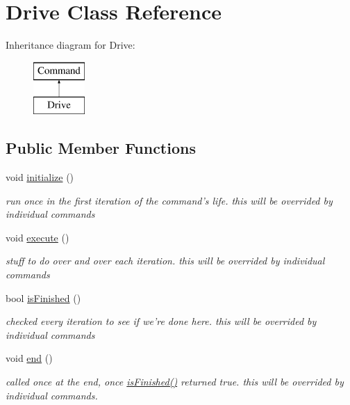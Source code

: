 \hypertarget{classDrive}{\section{Drive Class Reference}
\label{classDrive}
}
Inheritance diagram for Drive\-:\begin{figure}[H]
\begin{center}
\leavevmode
\includegraphics[height=2.000000cm]{classDrive}
\end{center}
\end{figure}
\subsection*{Public Member Functions}
\begin{DoxyCompactItemize}
\item 
\hypertarget{classDrive_af986858a5eebcca5a80569d7d4174c7f}{void \hyperlink{classDrive_af986858a5eebcca5a80569d7d4174c7f}{initialize} ()}\label{classDrive_af986858a5eebcca5a80569d7d4174c7f}

\begin{DoxyCompactList}\small\item\em run once in the first iteration of the command's life. this will be overrided by individual commands \end{DoxyCompactList}\item 
\hypertarget{classDrive_acda08e791c3016be8336a888d4baab3d}{void \hyperlink{classDrive_acda08e791c3016be8336a888d4baab3d}{execute} ()}\label{classDrive_acda08e791c3016be8336a888d4baab3d}

\begin{DoxyCompactList}\small\item\em stuff to do over and over each iteration. this will be overrided by individual commands \end{DoxyCompactList}\item 
bool \hyperlink{classDrive_a8f75240bfe7e8ca61f48bf6c322a3e6c}{is\-Finished} ()
\begin{DoxyCompactList}\small\item\em checked every iteration to see if we're done here. this will be overrided by individual commands \end{DoxyCompactList}\item 
\hypertarget{classDrive_aa52dc86430f29f4ddc7c6b7c35bd2232}{void \hyperlink{classDrive_aa52dc86430f29f4ddc7c6b7c35bd2232}{end} ()}\label{classDrive_aa52dc86430f29f4ddc7c6b7c35bd2232}

\begin{DoxyCompactList}\small\item\em called once at the end, once \hyperlink{classDrive_a8f75240bfe7e8ca61f48bf6c322a3e6c}{is\-Finished()} returned true. this will be overrided by individual commands. \end{DoxyCompactList}\end{DoxyCompactItemize}
